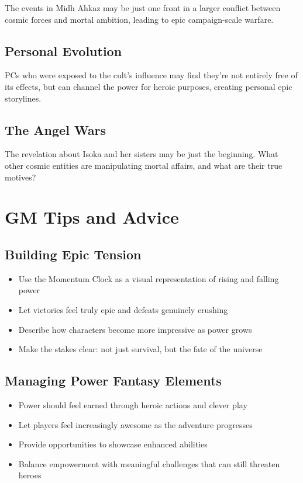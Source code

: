 \documentclass[12pt,twoside]{article}
\begin{document}
The events in Midh Ahkaz may be just one front in a larger conflict between cosmic forces and mortal ambition, leading to epic campaign-scale warfare.

\subsection{Personal Evolution}

PCs who were exposed to the cult's influence may find they're not entirely free of its effects, but can channel the power for heroic purposes, creating personal epic storylines.

\subsection{The Angel Wars}

The revelation about Isoka and her sisters may be just the beginning. What other cosmic entities are manipulating mortal affairs, and what are their true motives?

\section{GM Tips and Advice}

\subsection{Building Epic Tension}

\begin{itemize}
  \item Use the Momentum Clock as a visual representation of rising and falling power
  \item Let victories feel truly epic and defeats genuinely crushing
  \item Describe how characters become more impressive as power grows
  \item Make the stakes clear: not just survival, but the fate of the universe
\end{itemize}

\subsection{Managing Power Fantasy Elements}

\begin{itemize}
  \item Power should feel earned through heroic actions and clever play
  \item Let players feel increasingly awesome as the adventure progresses
  \item Provide opportunities to showcase enhanced abilities
  \item Balance empowerment with meaningful challenges that can still threaten heroes
\end{itemize}
\end{document}
